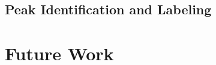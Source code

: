 \documentclass[pdf,12pt,report,strict]{SANDreport}
\begin{document}
\section{Peak Identification and Labeling}
\label{sec:PeakIdentificationAndLabeling}


\chapter{Future Work}
\label{chap:FutureWork}








% 
\cleardoublepage
\providecommand*{\phantomsection}{}
\phantomsection
{}





\clearpage
{}
\printindex
\end{document}
